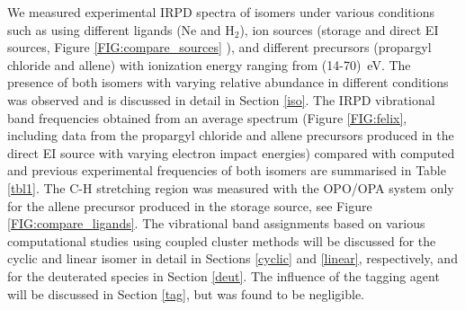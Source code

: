 We measured experimental IRPD spectra of \iso isomers under various conditions such as using different ligands (Ne and H$_2$), ion sources (storage and direct EI sources, Figure \ref{FIG:compare_sources} ), and different precursors (propargyl chloride and allene) with ionization energy ranging from (14-70)~eV. The presence of both isomers with varying relative abundance in different conditions was observed and is discussed in detail in Section \ref{iso}. The IRPD vibrational band frequencies obtained from an average spectrum (Figure \ref{FIG:felix}, including data from the propargyl chloride and allene precursors produced in the direct EI source with varying electron impact energies) compared with computed and previous experimental frequencies of both isomers are summarised in Table \ref{tbl1}. The C-H stretching region was measured with the OPO/OPA system only for the allene precursor produced in the storage source, see Figure \ref{FIG:compare_ligands}. The vibrational band assignments based on various computational studies using coupled cluster methods will be discussed for the cyclic and linear isomer in detail in Sections \ref{cyclic} and \ref{linear}, respectively, and for the deuterated species in Section \ref{deut}. The influence of the tagging agent will be discussed in Section \ref{tag}, but was found to be negligible.  \\ 



